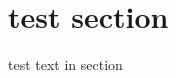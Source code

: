 \documentclass{article}
\begin{document}
\section{test section}
test text in section
\end{document}
